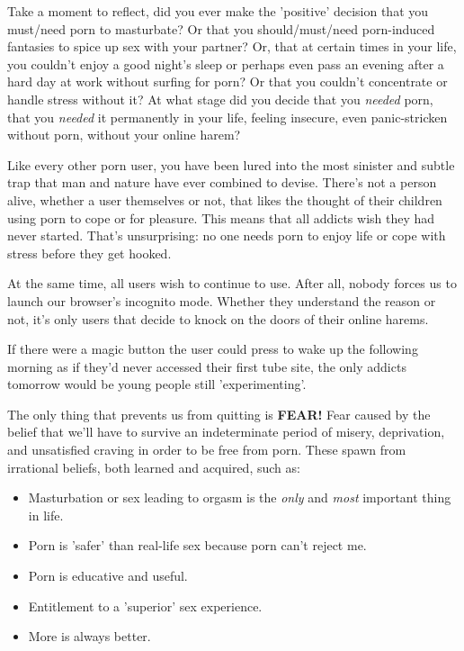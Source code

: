\documentclass[
]{book}
\begin{document}
Take a moment to reflect, did you ever make the 'positive' decision that you must/need porn to masturbate? Or that you should/must/need porn-induced fantasies to spice up sex with your partner? Or, that at certain times in your life, you couldn't enjoy a good night's sleep or perhaps even pass an evening after a hard day at work without surfing for porn? Or that you couldn't concentrate or handle stress without it? At what stage did you decide that you \emph{needed} porn, that you \emph{needed} it permanently in your life, feeling insecure, even panic-stricken without porn, without your online harem?

Like every other porn user, you have been lured into the most sinister and subtle trap that man and nature have ever combined to devise. There's not a person alive, whether a user themselves or not, that likes the thought of their children using porn to cope or for pleasure. This means that all addicts wish they had never started. That's unsurprising: no one needs porn to enjoy life or cope with stress before they get hooked.

At the same time, all users wish to continue to use. After all, nobody forces us to launch our browser's incognito mode. Whether they understand the reason or not, it's only users that decide to knock on the doors of their online harems.

If there were a magic button the user could press to wake up the following morning as if they'd never accessed their first tube site, the only addicts tomorrow would be young people still 'experimenting'.

The only thing that prevents us from quitting is \textbf{FEAR!} Fear caused by the belief that we'll have to survive an indeterminate period of misery, deprivation, and unsatisfied craving in order to be free from porn. These spawn from irrational beliefs, both learned and acquired, such as:

\begin{itemize}
\item
  Masturbation or sex leading to orgasm is the \emph{only} and \emph{most} important thing in life.
\item
  Porn is 'safer' than real-life sex because porn can't reject me.
\item
  Porn is educative and useful.
\item
  Entitlement to a 'superior' sex experience.
\item
  More is always better.
\end{itemize}
\end{document}

